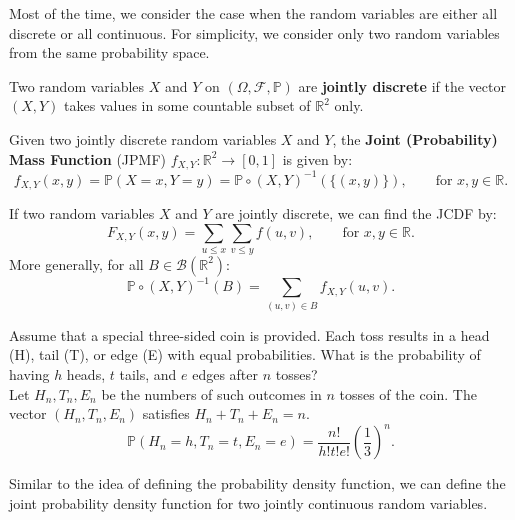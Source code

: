 \documentclass{huhtakm-template-book-v2}
\newcommand{\prob}{\mathbb{P}}
\begin{document}
    Most of the time, we consider the case when the random variables are either all discrete or all continuous. For simplicity, we consider only two random variables from the same probability space.
    \begin{defn}
        Two random variables $X$ and $Y$ on $(\Omega,\mathcal{F},\prob)$ are \textbf{jointly discrete} if the vector $(X,Y)$ takes values in some countable subset of $\mathbb{R}^{2}$ only.
    \end{defn}
    \begin{defn}
        Given two jointly discrete random variables $X$ and $Y$, the \textbf{Joint (Probability) Mass Function} (JPMF) $f_{X,Y}:\mathbb{R}^{2} \to [0,1]$ is given by:
        \begin{equation*}
            f_{X,Y}(x, y) = \prob(X = x,Y = y) = \prob \circ (X,Y)^{-1}(\{(x, y)\}), \qquad \text{for }x,y \in \mathbb{R}.
        \end{equation*}
    \end{defn}
    \begin{rem}
        If two random variables $X$ and $Y$ are jointly discrete, we can find the JCDF by:
        \begin{equation*}
            F_{X,Y}(x, y) = \sum_{u \leq x}\sum_{v \leq y}f(u, v), \qquad\text{for }x,y \in \mathbb{R}.
        \end{equation*}
        More generally, for all $B \in \mathcal{B}(\mathbb{R}^{2})$:
        \begin{equation*}
            \prob \circ (X,Y)^{-1}(B) = \sum_{(u, v) \in B}f_{X,Y}(u, v).
        \end{equation*}
    \end{rem}
    \begin{eg}
        Assume that a special three-sided coin is provided. Each toss results in a head (H), tail (T), or edge (E) with equal probabilities. What is the probability of having $h$ heads, $t$ tails, and $e$ edges after $n$ tosses?\\
        Let $H_{n},T_{n},E_{n}$ be the numbers of such outcomes in $n$ tosses of the coin. The vector $(H_{n},T_{n},E_{n})$ satisfies $H_{n}+T_{n}+E_{n} = n$.
        \begin{equation*}
            \prob(H_{n} = h,T_{n} = t,E_{n} = e) = \frac{n!}{h!t!e!}\left(\frac{1}{3}\right)^{n}.
        \end{equation*}
    \end{eg}
    Similar to the idea of defining the probability density function, we can define the joint probability density function for two jointly continuous random variables.
\end{document}
